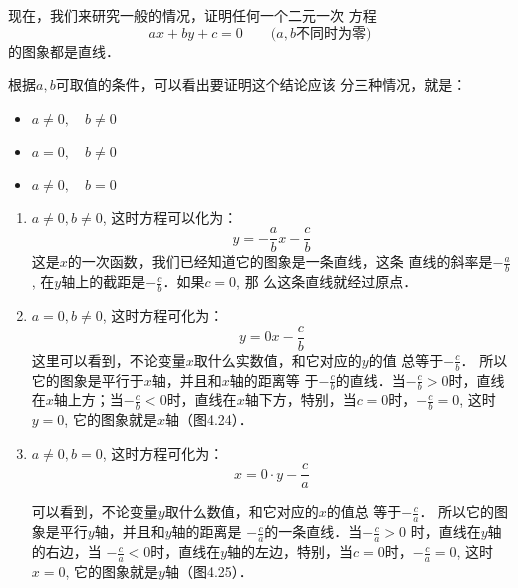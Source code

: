 现在，我们来研究一般的情况，证明任何一个二元一次
方程
\[ax+by+c=0\qquad  \text{($a,b$不同时为零)}\]
的图象都是直线．

根据$a,b$可取值的条件，可以看出要证明这个结论应该
分三种情况，就是：
\begin{itemize}
    \item $a\ne 0,\quad b\ne 0$
    \item $a=0,\quad b\ne 0$
    \item $a\ne 0,\quad  b=0$
\end{itemize}

\begin{enumerate}
    \item $a\ne 0,b\ne 0$, 这时方程可以化为：
    \begin{equation}
        y=-\frac{a}{b}x-\frac{c}{b}
    \end{equation}
这是$x$的一次函数，我们已经知道它的图象是一条直线，这条
直线的斜率是$-\frac{a}{b}$,
在$y$轴上的截距是$-\frac{c}{b}$．如果$c=0$, 那
么这条直线就经过原点．

\item $a=0,b\ne 0$, 这时方程可化为：
\begin{equation}
    y=0x-\frac{c}{b}
\end{equation}
这里可以看到，不论变量$x$取什么实数值，和它对应的$y$的值
总等于$-\frac{c}{b}$．
所以它的图象是平行于$x$轴，并且和$x$轴的距离等
于$-\frac{c}{b}$的直线．当$-\frac{c}{b}>0$时，直线在$x$轴上方；当$-\frac{c}{b}<0$时，直线在$x$轴下方，特别，当$c=0$时，$-\frac{c}{b}=0$, 这时
$y=0$, 它的图象就是$x$轴（图4.24）．

\item $a\ne 0,b=0$, 这时方程可化为：
\begin{equation}
    x=0\cdot y-\frac{c}{a}
\end{equation}

可以看到，不论变量$y$取什么数值，和它对应的$x$的值总
等于$-\frac{c}{a}$．
所以它的图象是平行$y$轴，并且和$y$轴的距离是
$-\frac{c}{a}$的一条直线．当$-\frac{c}{a}>0$
时，直线在$y$轴的右边，当
$-\frac{c}{a}<0$时，直线在$y$轴的左边，特别，当$c=0$时，$-\frac{c}{a}=0$,
这时$x=0$, 它的图象就是$y$轴（图4.25）．


\end{enumerate}
